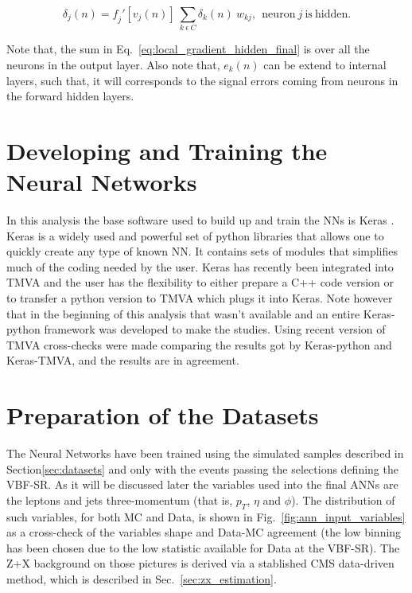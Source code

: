 \begin{equation}
\label{eq:local_gradient_hidden_final}
\delta_{j}(n) = \mathit{f}_{j}'[v_{j}(n)] ~ \sum_{k~\epsilon~C} \delta_{k}(n) ~ w_{kj},~~\mathrm{neuron}~j~\mathrm{is~hidden}.
\end{equation}

Note that, the sum in Eq.~\ref{eq:local_gradient_hidden_final} is over all the neurons in the output layer. Also note that, $e_{k}(n)$ can be extend to internal layers, such that, it will corresponds to the signal errors coming from neurons in the forward hidden layers.


\section{Developing and Training the Neural Networks}
\label{sec:developing_training_neural_networks}
In this analysis the base software used to build up and train the NNs
is Keras \cite{bib:KerasWebPage}. Keras is a widely used and powerful set of python libraries that allows one to quickly create any type of known NN. It contains sets of modules that simplifies much of the coding needed by the user. Keras has recently been integrated into TMVA \cite{bib:JPhysConfSer_898_072046_2017} and the user has the flexibility to either prepare a C++ code version or to transfer a python version to TMVA which plugs it into Keras. Note however that in the beginning of this analysis that wasn't available and an entire Keras-python framework was developed to make the studies. Using recent version of TMVA cross-checks were made comparing the results got by Keras-python and Keras-TMVA, and the results are in agreement.

\section{Preparation of the Datasets}
\label{subsec:datasets_preparation}
The Neural Networks have been trained using the simulated samples described in Section\ref{sec:datasets} and only with the events passing the selections defining the VBF-SR. As it will be discussed later the variables used into the final ANNs are the leptons and jets three-momentum (that is, $p_{T}$, $\eta$ and $\phi$). The distribution of such variables, for both MC and Data, is shown in Fig.~\ref{fig:ann_input_variables} as a cross-check of the variables shape and Data-MC agreement (the low binning has been chosen due to the low statistic available for Data at the VBF-SR). The Z+X background on those pictures is derived via a stablished CMS data-driven method, which is described in Sec.~\ref{sec:zx_estimation}.

